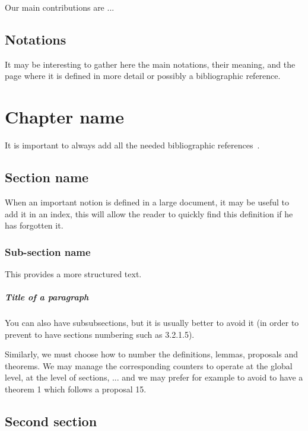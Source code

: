 \documentclass[11pt,a4paper,oneside]{book}
\begin{document}
Our main contributions are ...\vspace{1cm}

\clearpage
\section{Notations}

It may be interesting to gather here the main notations, their meaning, and the page where it is defined in more detail or possibly a bibliographic reference.

\chapter{Chapter name}

It is important to always add all the needed bibliographic references~\cite{ref1,ref3}.

\section{Section name}

When an important notion is defined in a large document, it may be useful to add it in an index, this will allow the reader to quickly find this definition if he has forgotten it.

\subsection{Sub-section name}

This provides a more structured text.

\paragraph{Title of a paragraph}

You can also have subsubsections, but it is usually better to avoid it (in order to prevent to have  sections numbering such as 3.2.1.5).

Similarly, we must choose how to number the definitions, lemmas, proposals and theorems. We may manage the corresponding counters to operate at the global level, at the level of sections, ... and we may prefer for example to avoid to have a theorem 1 which follows a proposal 15.

\section{Second section}
\end{document}
